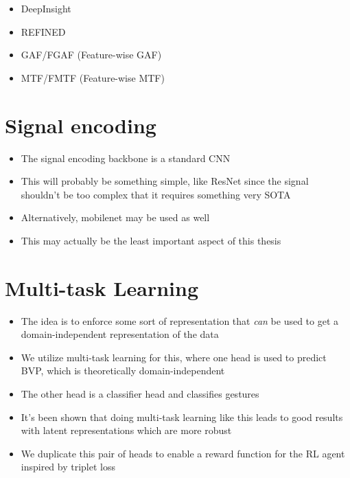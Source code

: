 \begin{itemize}
	\item DeepInsight
	\item REFINED
	\item GAF/FGAF (Feature-wise GAF) \cite{satyawan2023cnns}
	\item MTF/FMTF (Feature-wise MTF) \cite{satyawan2023cnns}
\end{itemize}

\section{Signal encoding}\label{sec:methodology-signal-encoding}

\begin{itemize}
	\item The signal encoding backbone is a standard CNN
	\item This will probably be something simple, like ResNet since the signal shouldn't be too complex that it requires something very SOTA
	\item Alternatively, mobilenet may be used as well
	\item This may actually be the least important aspect of this thesis
\end{itemize}

\section{Multi-task Learning}\label{sec:methodology-multi-task-learning}

\begin{itemize}
	\item The idea is to enforce some sort of representation that \textit{can} be used to get a domain-independent representation of the data
	\item We utilize multi-task learning for this, where one head is used to predict BVP, which is theoretically domain-independent \cite{zheng2019zero}
	\item The other head is a classifier head and classifies gestures
	\item It's been shown that doing multi-task learning like this leads to good results with latent representations which are more robust \cite{tuggener2021deepscoresv2}
	\item We duplicate this pair of heads to enable a reward function for the RL agent inspired by triplet loss
\end{itemize}

